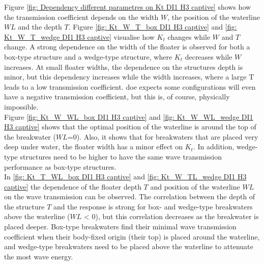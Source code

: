 Figure \ref{fig: Dependency different parametres on Kt  DI1 H3 captive} shows how the transmission coefficient depends on the width $W$, the position of the waterline $WL$ and the depth $T$. Figure \ref{fig: Kt_W_T_box DI1 H3 captive} and \ref{fig: Kt_W_T_wedge DI1 H3 captive} visualise how $K_t$ changes while $W$ and $T$ change. A strong dependence on the width of the floater is observed for both a box-type structure and a wedge-type structure, where $K_t$ decreases while $W$ increases. At small floater widths, the dependence on the structures depth is minor, but this dependency increases while the width increases, where a large T leads to a low transmission coefficient. \acrfull{doe} expects some configurations will even have a negative transmission coefficient, but this is, of course, physically impossible. \\
Figure \ref{fig: Kt_W_WL_box DI1 H3 captive} and \ref{fig: Kt_W_WL_wedge DI1 H3 captive} shows that the optimal position of the waterline is around the top of the breakwater ($WL$=0). Also, it shows that for breakwaters that are placed very deep under water, the floater width has a minor effect on $K_t$. In addition, wedge-type structures need to be higher to have the same wave transmission performance as box-type structures.\\
In \ref{fig: Kt_T_WL_box DI1 H3 captive} and \ref{fig: Kt_W_TL_wedge DI1 H3 captive} the dependence of the floater depth $T$ and position of the waterline $WL$ on the wave transmission can be observed. The correlation between the depth of the structure $T$ and the response is strong for box- and wedge-type breakwaters above the waterline ($WL$ < 0), but this correlation decreases as the breakwater is placed deeper. Box-type breakwaters find their minimal wave transmission coefficient when their body-fixed origin (their top) is placed around the waterline, and wedge-type breakwaters need to be placed above the waterline to attenuate the most wave energy. 

